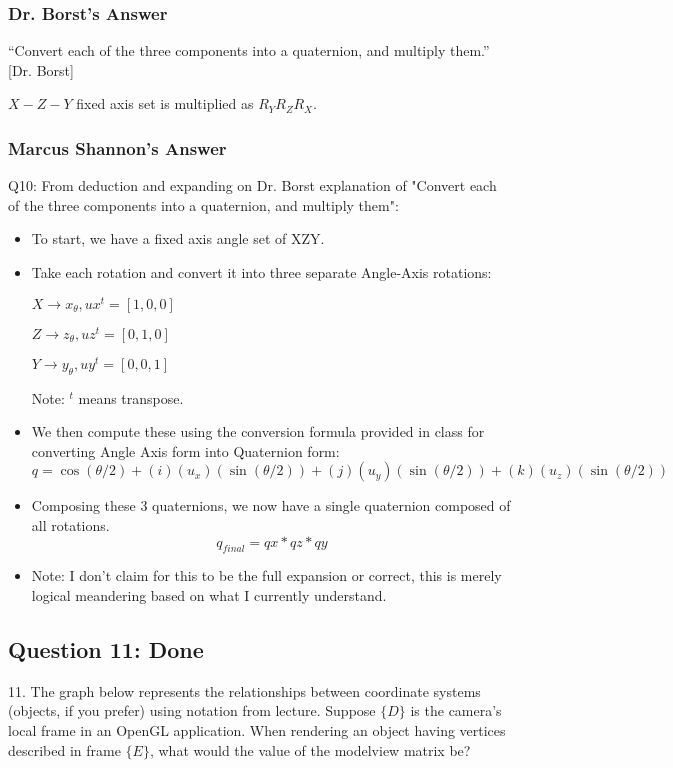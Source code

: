 \documentclass[11pt]{article}
\begin{document}
\begin{spacing}{1.2}
\subsubsection{Dr. Borst's Answer}

``Convert each of the three components into a quaternion, and multiply them.'' [Dr. Borst]

$X-Z-Y$ fixed axis set is multiplied as $R_YR_ZR_X$.

\subsubsection{Marcus Shannon's Answer}
Q10: From deduction and expanding on Dr. Borst explanation of  "Convert each of the three components into a quaternion, and multiply them":

\begin{itemize}
    \item To start, we have a fixed axis angle set of XZY.
    \item Take each rotation and convert it into three separate Angle-Axis rotations:
    
        $ X \to x_\theta, ux^t = [1, 0, 0]$
        
        $Z \to z_\theta, uz^t = [0, 1, 0]$
        
        $Y \to y_\theta, uy^t = [0, 0, 1]$
        
        Note: $^t$ means transpose.
    	\item We then compute these using the conversion formula provided in class for converting Angle Axis form into Quaternion form:
        $$q = \cos(\theta/2) + (i)(u_x)(\sin(\theta/2)) + (j)(u_y)(\sin(\theta/2)) + (k)(u_z)(\sin(\theta/2))$$
    \item Composing these 3 quaternions, we now have a single quaternion composed of all rotations.
        $$q_{final} = qx * qz * qy$$
    \item Note: I don't claim for this to be the full expansion or correct, this is merely logical meandering based on what I currently understand.
    \end{itemize}
    
\subsection{Question 11:  Done}
11.  The graph below represents the relationships between coordinate systems (objects, if you prefer) using notation from lecture.  Suppose $\{D\}$ is the camera's local frame in an OpenGL application.  When rendering an object having vertices described in frame $\{E\}$, what would the value of the modelview matrix be?


\end{spacing}
\end{document}
